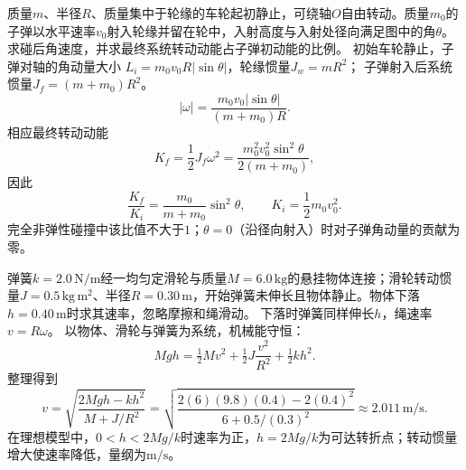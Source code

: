 \problemtext 质量$m$、半径$R$、质量集中于轮缘的车轮起初静止，可绕轴$O$自由转动。质量$m_0$的子弹以水平速率$v_0$射入轮缘并留在轮中，入射高度与入射处径向满足图中的角$\theta$。求碰后角速度，并求最终系统转动动能占子弹初动能的比例。
\workings
初始车轮静止，子弹对轴的角动量大小
$L_i=m_0v_0R|\sin\theta|$，轮缘惯量$J_w=mR^2$；
子弹射入后系统惯量$J_f=(m+m_0)R^2$。
\[
\boxed{|\omega|=\frac{m_0v_0|\sin\theta|}{(m+m_0)R}}.
\]
相应最终转动动能
\[
K_f=\frac12J_f\omega^2
=\frac{m_0^2v_0^2\sin^2\theta}{2(m+m_0)},
\]
因此
\[
\boxed{\frac{K_f}{K_i}=\frac{m_0}{m+m_0}\sin^2\theta},
\qquad K_i=\frac12m_0v_0^2.
\]
\crosscheck 完全非弹性碰撞中该比值不大于$1$；$\theta=0$（沿径向射入）时对子弹角动量的贡献为零。

\problemtext 弹簧$k=2.0\,\mathrm{N/m}$经一均匀定滑轮与质量$M=6.0\,\mathrm{kg}$的悬挂物体连接；滑轮转动惯量$J=0.5\,\mathrm{kg\,m^2}$、半径$R=0.30\,\mathrm m$，开始弹簧未伸长且物体静止。物体下落$h=0.40\,\mathrm m$时求其速率，忽略摩擦和绳滑动。
\workings
下落时弹簧同样伸长$h$，绳速率$v=R\omega$。
以物体、滑轮与弹簧为系统，机械能守恒：
\[
Mgh=\tfrac12Mv^2+\tfrac12J\frac{v^2}{R^2}+\tfrac12kh^2.
\]
整理得到
\[
\boxed{v=\sqrt{\frac{2Mgh-kh^2}{M+J/R^2}}}
=\sqrt{\frac{2(6)(9.8)(0.4)-2(0.4)^2}{6+0.5/(0.3)^2}}
\approx2.011\,\mathrm{m/s}.
\]
\crosscheck 在理想模型中，$0<h<2Mg/k$时速率为正，$h=2Mg/k$为可达转折点；转动惯量增大使速率降低，量纲为$\mathrm{m/s}$。

